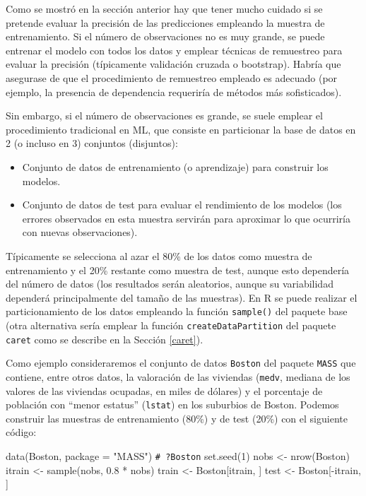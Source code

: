 \documentclass[
]{book}
\newenvironment{Shaded}{\begin{snugshade}}{\end{snugshade}}
\newcommand{\AttributeTok}[1]{\textcolor[rgb]{0.77,0.63,0.00}{#1}}
\newcommand{\CommentTok}[1]{\textcolor[rgb]{0.56,0.35,0.01}{\textit{#1}}}
\newcommand{\DecValTok}[1]{\textcolor[rgb]{0.00,0.00,0.81}{#1}}
\newcommand{\FloatTok}[1]{\textcolor[rgb]{0.00,0.00,0.81}{#1}}
\newcommand{\FunctionTok}[1]{\textcolor[rgb]{0.00,0.00,0.00}{#1}}
\newcommand{\NormalTok}[1]{#1}
\newcommand{\OtherTok}[1]{\textcolor[rgb]{0.56,0.35,0.01}{#1}}
\newcommand{\SpecialCharTok}[1]{\textcolor[rgb]{0.00,0.00,0.00}{#1}}
\newcommand{\StringTok}[1]{\textcolor[rgb]{0.31,0.60,0.02}{#1}}
\theoremstyle{break}
\theoremstyle{nonumberplain}
\renewcommand{\CommentTok}[1]{\textcolor[rgb]{0.41,0.41,0.41}{\texttt{#1}}}
\begin{document}
Como se mostró en la sección anterior hay que tener mucho cuidado si se pretende evaluar la precisión de las predicciones empleando la muestra de entrenamiento.
Si el número de observaciones no es muy grande, se puede entrenar el modelo con todos los datos y emplear técnicas de remuestreo para evaluar la precisión (típicamente validación cruzada o bootstrap).
Habría que asegurase de que el procedimiento de remuestreo empleado es adecuado (por ejemplo, la presencia de dependencia requeriría de métodos más sofisticados).

Sin embargo, si el número de observaciones es grande, se suele emplear el procedimiento tradicional en ML, que consiste en particionar la base de datos en 2 (o incluso en 3) conjuntos (disjuntos):

\begin{itemize}
\item
  Conjunto de datos de entrenamiento (o aprendizaje) para construir los modelos.
\item
  Conjunto de datos de test para evaluar el rendimiento de los modelos (los errores observados en esta muestra servirán para aproximar lo que ocurriría con nuevas observaciones).
\end{itemize}

Típicamente se selecciona al azar el 80\% de los datos como muestra de entrenamiento y el 20\% restante como muestra de test, aunque esto dependería del número de datos (los resultados serán aleatorios, aunque su variabilidad dependerá principalmente del tamaño de las muestras).
En R se puede realizar el particionamiento de los datos empleando la función \texttt{sample()} del paquete base (otra alternativa sería emplear la función \texttt{createDataPartition} del paquete \texttt{caret} como se describe en la Sección \ref{caret}).

Como ejemplo consideraremos el conjunto de datos \texttt{Boston} del paquete \texttt{MASS} que contiene, entre otros datos, la valoración de las viviendas (\texttt{medv}, mediana de los valores de las viviendas ocupadas, en miles de dólares) y el porcentaje de población con ``menor estatus'' (\texttt{lstat}) en los suburbios de Boston.
Podemos construir las muestras de entrenamiento (80\%) y de test (20\%) con el siguiente código:

\begin{Shaded}
\begin{Highlighting}[]
\FunctionTok{data}\NormalTok{(Boston, }\AttributeTok{package =} \StringTok{"MASS"}\NormalTok{) }\CommentTok{\# ?Boston}
\FunctionTok{set.seed}\NormalTok{(}\DecValTok{1}\NormalTok{)}
\NormalTok{nobs }\OtherTok{\textless{}{-}} \FunctionTok{nrow}\NormalTok{(Boston)}
\NormalTok{itrain }\OtherTok{\textless{}{-}} \FunctionTok{sample}\NormalTok{(nobs, }\FloatTok{0.8} \SpecialCharTok{*}\NormalTok{ nobs)}
\NormalTok{train }\OtherTok{\textless{}{-}}\NormalTok{ Boston[itrain, ]}
\NormalTok{test }\OtherTok{\textless{}{-}}\NormalTok{ Boston[}\SpecialCharTok{{-}}\NormalTok{itrain, ]}
\end{Highlighting}
\end{Shaded}
\end{document}
